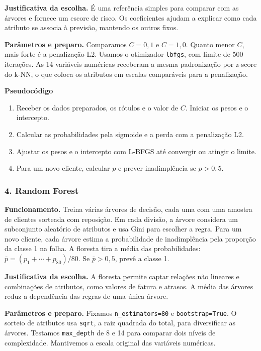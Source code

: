 \documentclass[11pt,a4paper]{article}
\begin{document}
\textbf{Justificativa da escolha.} É uma referência simples para comparar
com as árvores e fornece um escore de risco. Os coeficientes ajudam a
explicar como cada atributo se associa à previsão, mantendo os outros fixos.

\textbf{Parâmetros e preparo.} Comparamos $C=0{,}1$ e $C=1{,}0$.
Quanto menor $C$, mais forte é a penalização L2. Usamos o otimizador
\texttt{lbfgs}, com limite de 500 iterações. As 14 variáveis numéricas
receberam a mesma padronização por z-score do k-NN, o que coloca os
atributos em escalas comparáveis para a penalização.

\textbf{Pseudocódigo}
\begin{enumerate}\setlength{\itemsep}{0pt}
  \item Receber os dados preparados, os rótulos e o valor de $C$. Iniciar os pesos e o intercepto.
  \item Calcular as probabilidades pela sigmoide e a perda com a penalização L2.
  \item Ajustar os pesos e o intercepto com L-BFGS até convergir ou atingir o limite.
  \item Para um novo cliente, calcular $p$ e prever inadimplência se $p>0{,}5$.
\end{enumerate}

\subsubsection*{4. Random Forest}
\textbf{Funcionamento.} Treina várias árvores de decisão, cada uma com
uma amostra de clientes sorteada com reposição. Em cada divisão, a árvore
considera um subconjunto aleatório de atributos e usa Gini para escolher
a regra. Para um novo cliente, cada árvore estima a probabilidade de
inadimplência pela proporção da classe 1 na folha. A floresta tira a
média das probabilidades: $\bar p=(p_1+\cdots+p_{80})/80$. Se
$\bar p>0{,}5$, prevê a classe 1.

\textbf{Justificativa da escolha.} A floresta permite captar relações não
lineares e combinações de atributos, como valores de fatura e atrasos.
A média das árvores reduz a dependência das regras de uma única árvore.

\textbf{Parâmetros e preparo.} Fixamos \texttt{n\_estimators=80} e
\texttt{bootstrap=True}. O sorteio de atributos usa \texttt{sqrt},
a raiz quadrada do total, para diversificar as árvores. Testamos
\texttt{max\_depth} de 8 e 14 para comparar dois níveis de
complexidade. Mantivemos a escala original das variáveis numéricas.
\end{document}
